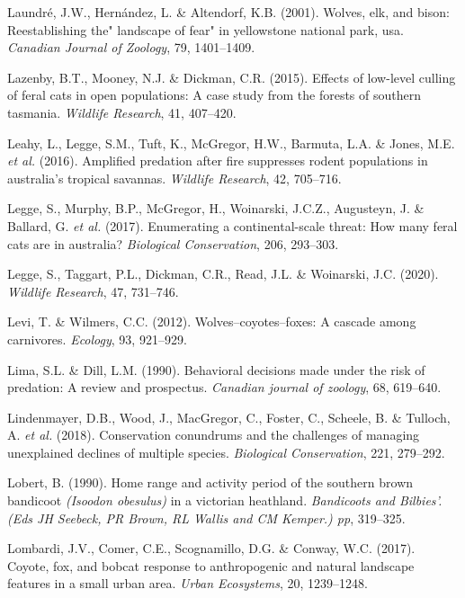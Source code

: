 \documentclass[11pt,a4paper,titlepage,twoside,openright]{style/unimelbthesis}
\begin{document}
\begin{mainmatter}
\leavevmode\hypertarget{ref-laundre2001wolves}{}%
Laundré, J.W., Hernández, L. \& Altendorf, K.B. (2001). Wolves, elk, and bison: Reestablishing the" landscape of fear" in yellowstone national park, usa. \emph{Canadian Journal of Zoology}, 79, 1401--1409.

\leavevmode\hypertarget{ref-lazenby2015effects}{}%
Lazenby, B.T., Mooney, N.J. \& Dickman, C.R. (2015). Effects of low-level culling of feral cats in open populations: A case study from the forests of southern tasmania. \emph{Wildlife Research}, 41, 407--420.

\leavevmode\hypertarget{ref-leahy2016amplified}{}%
Leahy, L., Legge, S.M., Tuft, K., McGregor, H.W., Barmuta, L.A. \& Jones, M.E. \emph{et al.} (2016). Amplified predation after fire suppresses rodent populations in australia's tropical savannas. \emph{Wildlife Research}, 42, 705--716.

\leavevmode\hypertarget{ref-legge2017enumerating}{}%
Legge, S., Murphy, B.P., McGregor, H., Woinarski, J.C.Z., Augusteyn, J. \& Ballard, G. \emph{et al.} (2017). Enumerating a continental-scale threat: How many feral cats are in australia? \emph{Biological Conservation}, 206, 293--303.

\leavevmode\hypertarget{ref-legge2020cat}{}%
Legge, S., Taggart, P.L., Dickman, C.R., Read, J.L. \& Woinarski, J.C. (2020). \emph{Wildlife Research}, 47, 731--746.

\leavevmode\hypertarget{ref-levi2012wolves}{}%
Levi, T. \& Wilmers, C.C. (2012). Wolves--coyotes--foxes: A cascade among carnivores. \emph{Ecology}, 93, 921--929.

\leavevmode\hypertarget{ref-lima1990behavioral}{}%
Lima, S.L. \& Dill, L.M. (1990). Behavioral decisions made under the risk of predation: A review and prospectus. \emph{Canadian journal of zoology}, 68, 619--640.

\leavevmode\hypertarget{ref-lindenmayer2018conservation}{}%
Lindenmayer, D.B., Wood, J., MacGregor, C., Foster, C., Scheele, B. \& Tulloch, A. \emph{et al.} (2018). Conservation conundrums and the challenges of managing unexplained declines of multiple species. \emph{Biological Conservation}, 221, 279--292.

\leavevmode\hypertarget{ref-lobert1990home}{}%
Lobert, B. (1990). Home range and activity period of the southern brown bandicoot \emph{(Isoodon obesulus)} in a victorian heathland. \emph{Bandicoots and Bilbies'.(Eds JH Seebeck, PR Brown, RL Wallis and CM Kemper.) pp}, 319--325.

\leavevmode\hypertarget{ref-lombardi2017coyote}{}%
Lombardi, J.V., Comer, C.E., Scognamillo, D.G. \& Conway, W.C. (2017). Coyote, fox, and bobcat response to anthropogenic and natural landscape features in a small urban area. \emph{Urban Ecosystems}, 20, 1239--1248.


\end{mainmatter}
\end{document}

